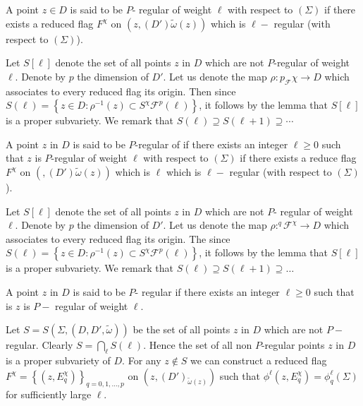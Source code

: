 \begin{defi*}
  A point $z \in D$ is said to be $P$- regular of weight $\ell$ with
  respect to $(\Sigma)$ if there exists a reduced flag $F^\chi$ on
  $(z,(D') \tilde{\omega}(z))$ which is $\ell -$ regular (with respect
  to $(\Sigma)$). 
\end{defi*}

Let $S[\ell]$ denote the set of all points $z$ in $D$ which are not
$P$-regular of weight $\ell$. Denote by $p$ the dimension of $D'$. Let
us denote the map $\rho : p_{\mathscr{F}}\chi \rightarrow D$ which
associates to every reduced flag its origin. Then since $ S(\ell)=
\left\{ z \in D : \rho^{-1} (z) \subset S^\chi \mathscr{F}^p
(\ell)\right\}$, it follows by the lemma that $S[\ell]$ is a proper
subvariety. We remark that $S(\ell)\supseteq S(\ell + 1 ) \supseteq
\cdots $ 

\begin{defi*}
  A point $z$ in $D$ is said to be $P$-regular of if there exists an
  integer $\ell \geq 0$ such that $z$ is $P$-regular of weight
  $\ell$
  with respect to $(\Sigma)$ if there exists a reduce flag $F^\chi$ on
  $(, (D') \tilde{\omega}(z))$ which is $\ell$ which is $\ell-$
  regular (with respect to $(\Sigma)$). 
\end{defi*}

Let $S[\ell]$ denote the set of all points $z$ in $D$ which are not
$P$- regular of weight $\ell$. Denote by $p$ the dimension of
$D'$. Let us denote the map $\rho : ^{q} \mathscr{F}^\chi \rightarrow
D$ which associates to every reduced flag its origin. The since $
S(\ell)= \left\{ z \in D :  \rho^{-1} (z) \subset S^\chi \mathscr{F}^p
(\ell) \right\}$, it follows by the lemma that $S[\ell]$ is a proper
subvariety. We remark that $S(\ell) \supseteq S (\ell + 1) \supseteq
\dots $ 

\begin{defi*}
  A point $z$ in $D$ is said to be $P$- regular if there exists an
  integer $\ell \geq 0$ such that is $z$ is $P-$ regular of weight
  $\ell$. 
\end{defi*}

Let $S=S(\Sigma, (D, D', \tilde{\omega}))$ be the set of all points
$z$ in $D$ which are not $P-$ regular. Clearly $S=
\bigcap\limits_\ell S(\ell)$. Hence the set of all non $P$-regular
points $z$ in $D$ is a proper subvariety of $D$. For any $z \notin S$ we
can construct a reduced flag $F^\chi= \left\{ (z,
E^\chi_q)\right\}_{q=0, 1, \ldots, p}$ on $(z,
(D')_{\tilde{\omega}(z)})$ such that $\phi^\ell (z, E^\chi_q)=
\phi^\ell_q (\Sigma)$ for sufficiently large $\ell$. 

